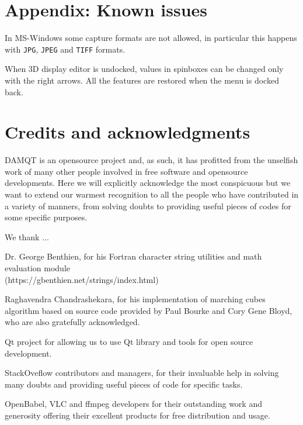 \documentclass[10pt]{article}
\begin{document}
\section{Appendix: Known issues\label{A7}}

In MS-Windows some capture formats are not allowed, in particular this happens with \texttt{JPG}, \texttt{JPEG} and \texttt{TIFF} formats.

When 3D display editor is undocked, values in spinboxes can be changed only with the right arrows. All the features are 
restored when the menu is docked back.

\section*{Credits and acknowledgments}

DAMQT is an opensource project and, as such, it has profitted from the 
unselfish work of many other people involved in free software and opensource developments.
Here we will explicitly acknowledge the most conspicuous but we want to extend our warmest
recognition to all the people who have contributed in a variety of manners, from solving doubts
to providing useful pieces of codes for some specific purposes.

We thank ...

Dr. George Benthien, for his Fortran character string utilities and math evaluation module \\
(https://gbenthien.net/strings/index.html)

Raghavendra Chandrashekara, for his implementation of marching cubes algorithm
based on source code provided by Paul Bourke and Cory Gene Bloyd, 
who are also gratefully acknowledged.

Qt project for allowing us to use Qt library and tools for open source development.

StackOveflow contributors and managers, for their invaluable help in solving many doubts 
and providing useful pieces of code for specific tasks.

OpenBabel, VLC and ffmpeg developers for their outstanding work and generosity offering
their excellent products for free distribution and usage.


\newpage

\listoffigures

\printindex
\end{document}
